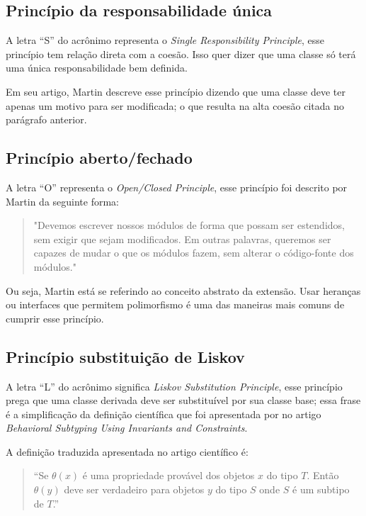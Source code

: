 \subsection{Princípio da responsabilidade única}
A letra “S” do acrônimo representa o \textit{Single Responsibility Principle}, esse princípio tem relação direta com a coesão. Isso quer dizer que uma classe só terá uma única responsabilidade bem definida.

Em seu artigo, Martin descreve esse princípio dizendo que uma classe deve ter apenas um motivo para ser modificada; o que resulta na alta coesão citada no parágrafo anterior.

\subsection{Princípio aberto/fechado}
A letra “O” representa o \textit{Open/Closed Principle}, esse princípio foi descrito por Martin da seguinte forma: 

\begin{quotation}
"Devemos escrever nossos módulos de forma que possam ser estendidos, sem exigir que sejam modificados. Em outras palavras, queremos ser capazes de mudar o que os módulos fazem, sem alterar o código-fonte dos módulos."
\end{quotation}

Ou seja, Martin está se referindo ao conceito abstrato da extensão. Usar heranças ou interfaces que permitem polimorfismo é uma das maneiras mais comuns de cumprir esse princípio.

\subsection{Princípio substituição de Liskov}\label{sec:liskov}
A letra “L” do acrônimo significa \textit{Liskov Substitution Principle}, esse princípio prega que uma classe derivada deve ser substituível por sua classe base; essa frase é a simplificação da definição científica que foi apresentada por \textcite{liskov} no artigo \textit{Behavioral Subtyping Using Invariants and Constraints}.

A definição traduzida apresentada no artigo científico é:

\begin{quotation}
“Se $\theta(x)$ é uma propriedade provável dos objetos $x$ do tipo $T$. Então $\theta(y)$ deve ser verdadeiro para objetos $y$ do tipo $S$ onde $S$ é um subtipo de $T$.”
\end{quotation}

